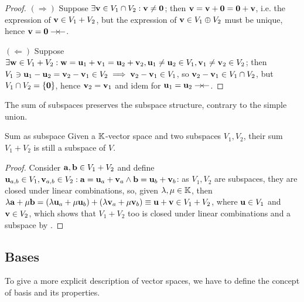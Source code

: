 \begin{proofbox}
  \begin{proof}
    $ (\Rightarrow) $ Suppose $ \exists \mathbf{v} \in V_1 \cap V_2 : \mathbf{v} \neq \mathbf{0} $; then $ \mathbf{v} = \mathbf{v} + \mathbf{0} = \mathbf{0} + \mathbf{v} $, i.e. the expression of $ \mathbf{v} \in V_1 + V_2 $, but the expression of $ \mathbf{v} \in V_1 \oplus V_2 $ must be unique, hence $ \mathbf{v} = \mathbf{0} \rightarrow \hspace{-0.15em} \leftarrow $.

    $ (\Leftarrow) $ Suppose $ \exists \mathbf{w} \in V_1 + V_2 : \mathbf{w} = \mathbf{u}_1 + \mathbf{v}_1 = \mathbf{u}_2 + \mathbf{v}_2 , \mathbf{u}_1 \neq \mathbf{u}_2 \in V_1 , \mathbf{v}_1 \neq \mathbf{v}_2 \in V_2 $; then $ V_1 \ni \mathbf{u}_1 - \mathbf{u}_2 = \mathbf{v}_2 - \mathbf{v}_1 \in V_2 \implies \mathbf{v}_2 - \mathbf{v}_1 \in V_1 $, so $ \mathbf{v}_2 - \mathbf{v}_1 \in V_1 \cap V_2 $, but $ V_1 \cap V_2 = \{\mathbf{0}\} $, hence $ \mathbf{v}_2 = \mathbf{v}_1 $ and idem for $ \mathbf{u}_1 = \mathbf{u}_2 \rightarrow \hspace{-0.15em} \leftarrow $.
  \end{proof}
\end{proofbox}

The sum of subspaces preserves the subspace structure, contrary to the simple union.

\begin{proposition}{Sum as subspace}{}
  Given a $ \mathbb{K} $-vector space and two subspaces $ V_1 , V_2 $, their sum $ V_1 + V_2 $ is still a subspace of $ V $.
\end{proposition}

\begin{proofbox}
  \begin{proof}
    Consider $ \mathbf{a} , \mathbf{b} \in V_1 + V_2 $ and define $ \mathbf{u}_{a,b} \in V_1 , \mathbf{v}_{a,b} \in V_2 : \mathbf{a} = \mathbf{u}_a + \mathbf{v}_a \land \mathbf{b} = \mathbf{u}_b + \mathbf{v}_b $: as $ V_1 , V_2 $ are subspaces, they are closed under linear combinations, so, given $ \lambda ,\mu \in \mathbb{K} $, then $ \lambda \mathbf{a} + \mu \mathbf{b} = (\lambda \mathbf{u}_a + \mu \mathbf{u}_b) + (\lambda \mathbf{v}_a + \mu \mathbf{v}_b) \equiv \mathbf{u} + \mathbf{v} \in V_1 + V_2 $, where $ \mathbf{u} \in V_1 $ and $ \mathbf{v} \in V_2 $, which shows that $ V_1 + V_2 $ too is closed under linear combinations and a subspace by .
  \end{proof}
\end{proofbox}

\subsection{Bases}

To give a more explicit description of vector spaces, we have to define the concept of basis and its properties.

